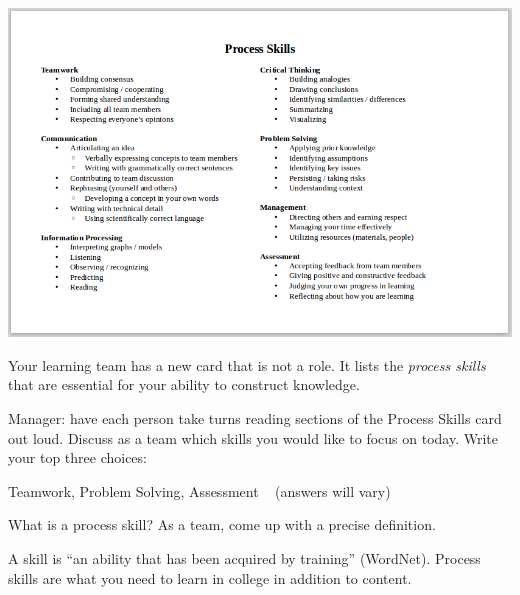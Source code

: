
\vspace{-1ex}
\begin{multicols}{2}

\begin{center}
\includegraphics[width=0.8\linewidth]{process1.png}
\end{center}

\columnbreak
\vspace*{2em}

Your learning team has a new card that is not a role.
It lists the \emph{process skills} that are essential for your ability to construct knowledge.


\end{multicols}




\Q Manager: have each person take turns reading sections of the Process Skills card out loud.
Discuss as a team which skills you would like to focus on today.
Write your top three choices:

\begin{answer}
Teamwork, Problem Solving, Assessment ~ (answers will vary)
\end{answer}


\Q What is a process skill?
As a team, come up with a precise definition.

\begin{answer}
A skill is ``an ability that has been acquired by training'' (WordNet).
Process skills are what you need to learn in college in addition to content.
\end{answer}


